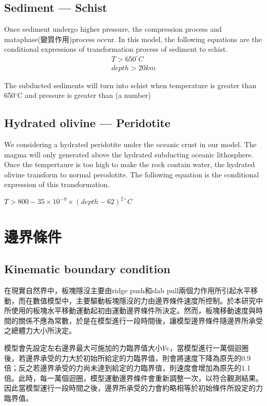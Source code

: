 \subsection{Sediment --- Schist}

Once sediment undergo higher pressure, the compression process and mataphase(變質作用)process occur.
In this model, the following equations are the conditional expressions of transformation process of sediment to schist.
\begin{align}
T > 650^{\circ} C\\
depth >  20 km 
\end{align}

The subducted sediments will turn into schist when temperature is greater than 650$^\circ$C and pressure is greater than (a number)

\subsection{Hydrated olivine --- Peridotite}

We considering a hydrated peridotite under the oceanic crust in our model. 
The magma will only generated above the hydrated subducting oceanic lithosphere.
Once the tempertaure is too high to make the rock contain water, the hydrated olivine transform to normal perodotite.
The following equation is the conditional expression of this transformation.

$T > 800-35\times 10^{-9}\times (depth-62)^{2\circ}C$

\section{邊界條件}

\subsection{Kinematic boundary condition}
在現實自然界中，板塊隱沒主要由ridge push和slab pull兩個力作用所引起水平移動，而在數值模型中，主要驅動板塊隱沒的力由邊界條件速度所控制。於本研究中所使用的板塊水平移動運動起初由運動邊界條件所決定。然而，板塊移動速度與時間的關係不應為常數，於是在模型進行一段時間後，讓模型邊界條件隨邊界所承受之總體力大小所決定。

模型會先設定左右邊界最大可施加的力臨界值大小Fc，當模型進行一萬個迴圈後，若邊界承受的力大於初始所給定的力臨界值，則會將速度下降為原先的0.9倍；反之若邊界承受的力尚未達到給定的力臨界值，則速度會增加為原先的1.1倍。此時，每一萬個迴圈，模型運動邊界條件會重新調整一次，以符合觀測結果。因此當模型運行一段時間之後，邊界所承受的力會約略相等於初始條件所設定的力臨界值。

